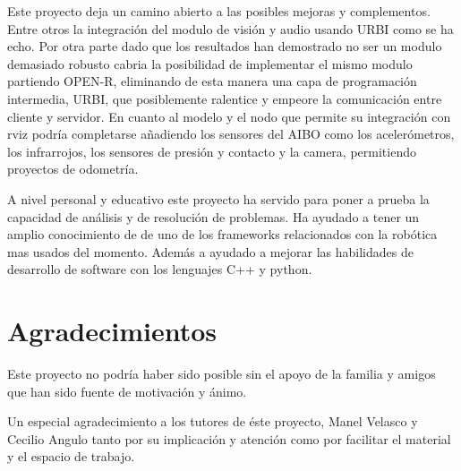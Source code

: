 \documentclass[12pt,a4paper,final,twoside]{book}
\begin{document}
Este proyecto deja un camino abierto a las posibles mejoras y complementos. Entre otros la integración del modulo de visión y audio usando URBI como se ha echo. Por otra parte dado que los resultados han demostrado no ser un modulo demasiado robusto cabria la posibilidad de implementar el mismo modulo partiendo OPEN-R, eliminando de esta manera una capa de programación intermedia, URBI, que posiblemente ralentice y empeore la comunicación entre cliente y servidor. En cuanto al modelo y el nodo que permite su integración con rviz podría completarse añadiendo los sensores del AIBO como los acelerómetros, los infrarrojos, los sensores de presión y contacto y la camera, permitiendo proyectos de odometría.

A nivel personal y educativo este proyecto ha servido para poner a prueba la capacidad de análisis y de resolución de problemas. Ha ayudado a tener un amplio conocimiento de de uno de los frameworks relacionados con la robótica mas usados del momento. Además a ayudado a mejorar las habilidades de desarrollo de software con los lenguajes C++ y python. 

\newpage
\chapter*{Agradecimientos}
\thispagestyle{fancy}
Este proyecto no podría haber sido posible sin el apoyo de la familia y amigos que han sido fuente de motivación y ánimo.

Un especial agradecimiento a los tutores de éste proyecto, Manel Velasco y Cecilio Angulo tanto por su implicación y atención como por facilitar el material y el espacio de trabajo.
\end{document}
